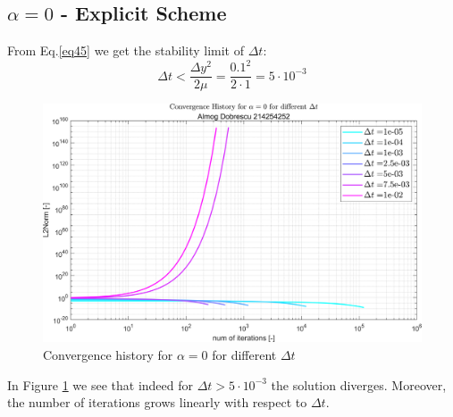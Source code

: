 \documentclass[11pt, a4paper]{article}
\begin{document}
\subsection{$\alpha = 0$ - Explicit Scheme}
From Eq.\ref{eq45} we get the stability limit of $\Delta t$:
\begin{equation}
    \Delta t < \frac{\Delta y^2}{2\mu} = \frac{0.1^2}{2\cdot1} = 5\cdot10^{-3}
    \label{eq:clc_delta_t}
\end{equation}
\begin{figure}[H]
    \centering
    \includegraphics[width=.8\textwidth]{images/grap1.png}
    \caption{Convergence history for $\alpha=0$ for different $\Delta t$}
    \label{fig1}
\end{figure}
\noindent In Figure \ref{fig1} we see that indeed for $\Delta t>5\cdot10^{-3}$ the solution diverges.
Moreover, the number of iterations grows linearly with respect to $\Delta t$.
\end{document}
